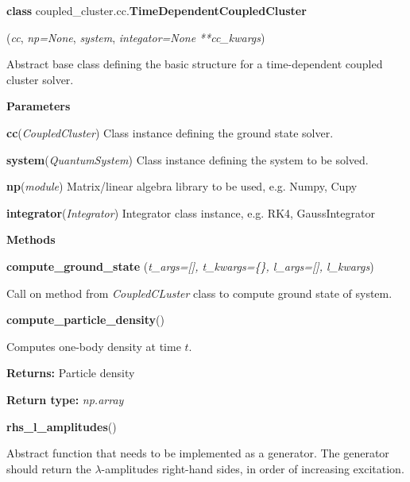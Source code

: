 \begin{tcolorbox}
    {\selectfont
    \textbf{class} coupled\_cluster.cc.\textbf{TimeDependentCoupledCluster}

    \hspace{1em}(\emph{cc}, \emph{np=None}, \emph{system}, 
    \emph{integator=None} \emph{**cc\_kwargs})

    \vspace{1em}
    Abstract base class defining the basic structure for a time-dependent coupled cluster 
    solver.

    \vspace{1em}
    \textbf{Parameters}

    \hspace{2em}\textbf{cc}(\emph{CoupledCluster})
        Class instance defining the ground state solver.

    \hspace{2em}\textbf{system}(\emph{QuantumSystem}) 
        Class instance defining the system to be solved.

    \hspace{2em}\textbf{np}(\emph{module})
        Matrix/linear algebra library to be used, e.g. Numpy, Cupy
    
    \hspace{2em}\textbf{integrator}(\emph{Integrator})
        Integrator class instance, e.g. RK4, GaussIntegrator

    \vspace{1em}
    \textbf{Methods}

    \hspace{2em} \textbf{compute\_ground\_state}
        (\emph{t\_args=[], \emph{t\_kwargs=\{\}},
        \emph{l\_args=[]}, \emph{l\_kwargs}})
        \begin{adjustwidth}{4em}{}
        Call on method from \emph{CoupledCLuster} class to compute ground
        state of system.           
        \end{adjustwidth}


    \hspace{2em} \textbf{compute\_particle\_density}()
        \begin{adjustwidth}{4em}{}
        Computes one-body density at time $t$.

        \textbf{Returns:} Particle density 

        \textbf{Return type:} \emph{np.array} 
        \end{adjustwidth}     

    \hspace{2em} \textbf{rhs\_l\_amplitudes}()
        \begin{adjustwidth}{4em}{}
        Abstract function that needs to be implemented as a generator. The generator 
        should return the $\lambda$-amplitudes right-hand sides, in order of 
        increasing excitation.           
        \end{adjustwidth}

}
\end{tcolorbox}
